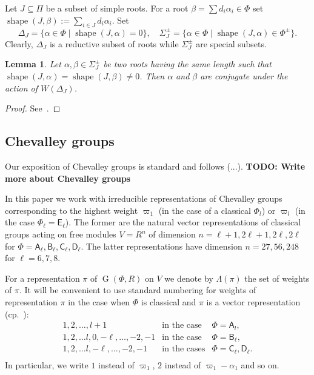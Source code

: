\documentclass[12pt]{amsart}
\numberwithin{equation}{section}
\newtheorem{lemma}[lemmacounter]{Lemma}
\theoremstyle{definition}
\DeclareMathOperator{\G}{G}
\DeclareMathOperator{\shape}{shape}
\newcommand{\rA}{\mathsf{A}}
\newcommand{\rB}{\mathsf{B}}
\newcommand{\rC}{\mathsf{C}}
\newcommand{\rD}{\mathsf{D}}
\newcommand{\rE}{\mathsf{E}}
\begin{document}
Let $J\subseteq \Pi$ be a subset of simple roots. 
For a root $\beta = \sum d_i\alpha_i \in \Phi$ set $\shape(J, \beta):=\sum\limits_{i\in J}d_i \alpha_i$.
Set $$\Delta_J = \{\alpha \in \Phi \mid \shape(J, \alpha)=0\},\quad \Sigma^\pm_J = \{\alpha \in \Phi \mid \shape(J, \alpha)\in\Phi^\pm \}.$$
Clearly, $\Delta_J$ is a reductive subset of roots while $\Sigma^\pm_J$ are special subsets.

\begin{lemma}\label{lemma:abs} Let $\alpha, \beta \in \Sigma^\pm_J$ be two roots having the same length such that $\shape(J,\alpha)=\shape(J,\beta)\neq 0$.
Then $\alpha$ and $\beta$ are conjugate under the action of $W(\Delta_J)$. \end{lemma} \begin{proof} See~\cite[Lemma~1]{ABS}. \end{proof}

\subsection{Chevalley groups}
Our exposition of Chevalley groups is standard and follows (...).
\textbf{TODO: Write more about Chevalley groups}

In this paper we work with irreducible representations of Chevalley groups corresponding to the highest weight
$\varpi_1$ (in the case of a classical $\Phi_l$) or $\varpi_l$ (in the case $\Phi_\ell=\rE_\ell$). 
The former are the natural vector representations of classical groups acting on free modules $V=R^n$ of dimension 
$n=\ell+1, 2\ell+1, 2\ell,2\ell$ for $\Phi=\rA_\ell,\rB_\ell,\rC_\ell,\rD_\ell$.
The latter representations have dimension $n=27, 56, 248$ for $\ell=6,7,8$.

For a representation $\pi$ of $\G(\Phi, R)$ on $V$ we denote by $\Lambda(\pi)$ the set of weights of $\pi$.
It will be convenient to use standard numbering for weights of representation $\pi$ in the case when $\Phi$ is classical and $\pi$ is a vector representation (cp.~\cite[§1B]{St78}):
$$\begin{array}{cll}
  1,2,\ldots, l+1 & \text{in the case} & \Phi =\rA_l, \\
  1,2,\ldots l, 0, -\ell,\ldots, -2, -1 & \text{in the case} & \Phi =\rB_\ell, \\
  1,2,\ldots l, -\ell,\ldots, -2, -1 & \text{in the cases}   & \Phi =\rC_\ell, \rD_\ell. \\
\end{array}$$
In particular, we write $1$ instead of $\varpi_1$, $2$ instead of $\varpi_1-\alpha_1$ and so on.
\end{document}
